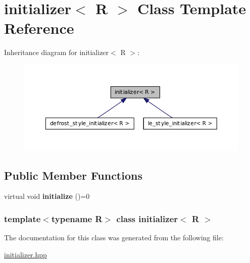 \hypertarget{classinitializer}{
\section{initializer$<$ R $>$ Class Template Reference}
\label{classinitializer}
}


Inheritance diagram for initializer$<$ R $>$:
\nopagebreak
\begin{figure}[H]
\begin{center}
\leavevmode
\includegraphics[width=398pt]{classinitializer__inherit__graph}
\end{center}
\end{figure}
\subsection*{Public Member Functions}
\begin{DoxyCompactItemize}
\item 
\hypertarget{classinitializer_a2d4f4facf21abb93ad032dd51c77e082}{
virtual void {\bfseries initialize} ()=0}
\label{classinitializer_a2d4f4facf21abb93ad032dd51c77e082}

\end{DoxyCompactItemize}
\subsubsection*{template$<$typename R$>$ class initializer$<$ R $>$}



The documentation for this class was generated from the following file:\begin{DoxyCompactItemize}
\item 
\hyperlink{initializer_8hpp}{initializer.hpp}\end{DoxyCompactItemize}
